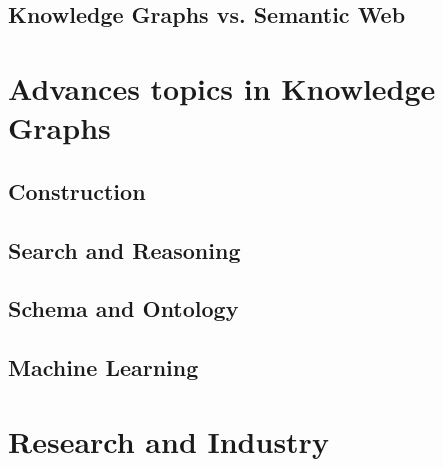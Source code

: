 \documentclass[12pt]{report} %
\begin{document}
\subsection{Knowledge Graphs vs. Semantic Web}


\section{Advances topics in Knowledge Graphs}

\subsection{Construction}

\subsection{Search and Reasoning}

\subsection{Schema and Ontology}

\subsection{Machine Learning}


\section{Research and Industry}


\backmatter

\newpage
\printglossary[type=\acronymtype, title=Acronymes]

\printglossary[title=Glossaire]

\newpage
\printbibliography[
    heading=bibintoc,
    category=cited,
    title={References}
]

\printbibliography[
    notcategory=cited,
    heading=bibintoc,
    title={Additional bibliography},
]


\restoregeometry
\end{document}
